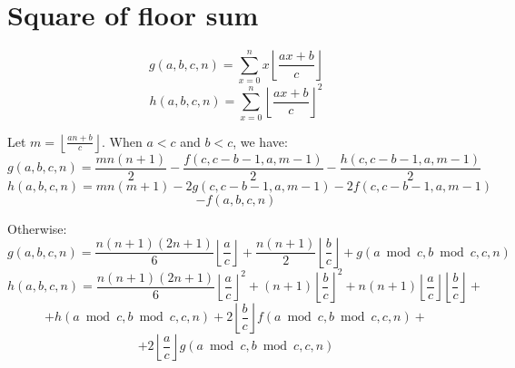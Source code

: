 \section{Square of floor sum}

$$g(a, b, c, n) = \sum_{x=0}^n x \left\lfloor\frac{ax + b}{c}\right\rfloor$$
$$h(a, b, c, n) = \sum_{x=0}^n {\left\lfloor\frac{ax + b}{c}\right\rfloor}^2$$

Let $m = \left\lfloor\frac{an + b}{c}\right\rfloor$. When $a < c$ and $b < c$, we have:
$$g(a, b, c, n) = \frac{mn(n + 1)}{2} - \frac{f(c, c - b - 1, a, m - 1)}{2} - \frac{h(c, c - b - 1, a, m - 1)}{2}$$
$$h(a, b, c, n) = mn(m + 1) - 2g(c, c - b - 1, a, m - 1) - 2f(c, c - b - 1, a, m - 1)$$$$- f(a, b, c, n)$$

Otherwise:
$$g(a, b, c, n) = \frac{n(n + 1)(2n + 1)}{6} \left\lfloor\frac{a}{c}\right\rfloor + \frac{n(n + 1)}{2} \left\lfloor\frac{b}{c}\right\rfloor + g(a \bmod c, b \bmod c, c, n)$$
$$h(a, b, c, n) = \frac{n(n + 1)(2n + 1)}{6} \left\lfloor\frac{a}{c}\right\rfloor^2 + (n + 1) \left\lfloor\frac{b}{c}\right\rfloor^2 + n(n + 1) \left\lfloor\frac{a}{c}\right\rfloor \left\lfloor\frac{b}{c}\right\rfloor +$$$$+ h(a \bmod c, b \bmod c, c, n) + 2 \left\lfloor\frac{b}{c}\right\rfloor f(a \bmod c, b \bmod c, c, n) +$$$$+ 2 \left\lfloor\frac{a}{c}\right\rfloor g(a \bmod c, b \bmod c, c, n)$$
